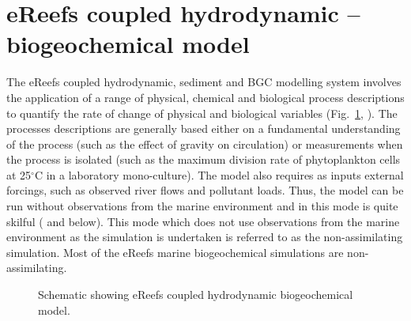 \documentclass{elsart}
\begin{document}
\section{eReefs coupled hydrodynamic -- biogeochemical model}

The eReefs coupled hydrodynamic, sediment and BGC modelling system involves the application of a range of physical, chemical and biological process descriptions to quantify the rate of change of physical and biological variables (Fig.~\ref{fig:bgc}, \citet{Schiller14}). The processes descriptions are generally based either on a fundamental understanding of the process (such as the effect of gravity on circulation) or measurements when the process is isolated (such as the maximum division rate of phytoplankton cells at 25$^{\circ}$C in a laboratory mono-culture). The model also requires as inputs external forcings, such as observed river flows and pollutant loads. Thus, the model can be run without observations from the marine environment and in this mode is quite skilful (\citet{Skerratt18} and below). This mode which does not use observations from the marine environment as the simulation is undertaken is referred to as the non-assimilating simulation. Most of the eReefs marine biogeochemical simulations are non-assimilating.

\begin{figure}[thb]
\begin{center}
\caption{Schematic showing eReefs coupled hydrodynamic biogeochemical model.}
\label{fig:bgc}
\end{center}
\end{figure}
\end{document}
